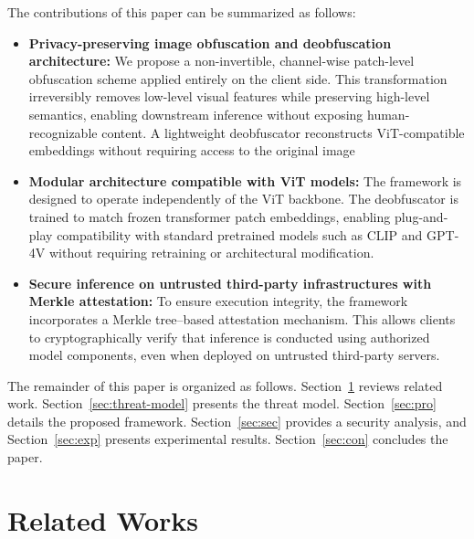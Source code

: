 \documentclass{ieeeaccess}
\begin{document}
The contributions of this paper can be summarized as follows:
\begin{itemize}
    \item \textbf{Privacy-preserving image obfuscation and deobfuscation architecture:} We propose a non-invertible, channel-wise patch-level obfuscation scheme applied entirely on the client side. This transformation irreversibly removes low-level visual features while preserving high-level semantics, enabling downstream inference without exposing human-recognizable content. A lightweight deobfuscator reconstructs ViT-compatible embeddings without requiring access to the original image
    \item \textbf{Modular architecture compatible with ViT models:} The framework is designed to operate independently of the ViT backbone. The deobfuscator is trained to match frozen transformer patch embeddings, enabling plug-and-play compatibility with standard pretrained models such as CLIP and GPT-4V without requiring retraining or architectural modification.
    \item \textbf{Secure inference on untrusted third-party infrastructures with Merkle attestation:} To ensure execution integrity, the framework incorporates a Merkle tree–based attestation mechanism. This allows clients to cryptographically verify that inference is conducted using authorized model components, even when deployed on untrusted third-party servers.
\end{itemize}

The remainder of this paper is organized as follows. Section~\ref{sec:rel} reviews related work. Section~\ref{sec:threat-model} presents the threat model. Section~\ref{sec:pro} details the proposed framework. Section~\ref{sec:sec} provides a security analysis, and Section~\ref{sec:exp} presents experimental results. Section~\ref{sec:con} concludes the paper.

\section{Related Works} \label{sec:rel}
\end{document}
